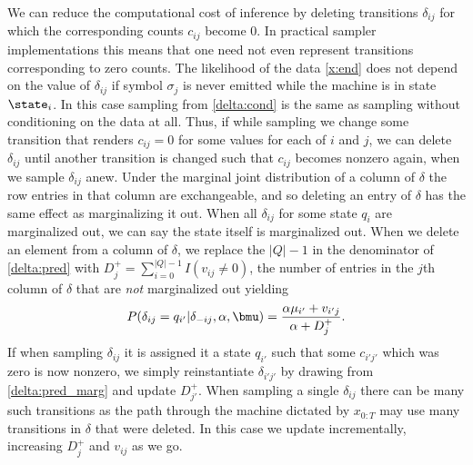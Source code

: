 We can reduce the computational cost of inference by deleting transitions $\delta_{ij}$ for which the corresponding counts $c_{ij}$ become 0.  In practical sampler implementations this means that one need not even represent transitions corresponding to zero counts.  The likelihood of the data \eqref{x:end} does not depend on the value of $\delta_{ij}$ if symbol $\sigma_j$ is never emitted while the machine is in state $\state_i$.   In this case sampling from \eqref{delta:cond} is the same as sampling without conditioning on the data at all.  Thus, if while sampling we change some transition that renders $c_{ij}=0$ for some values for each of $i$ and $j$, we can delete $\delta_{ij}$ until another transition is changed such that $c_{ij}$ becomes nonzero again, when we sample $\delta_{ij}$ anew.  Under the marginal joint distribution of a column of $\delta$ the row entries in that column are exchangeable, and so deleting an entry of $\delta$ has the same effect as marginalizing it out.  When all $\delta_{ij}$ for some state $q_i$ are marginalized out, we can say the state itself is marginalized out.
When we delete an element from a column of $\delta$, we replace the $|Q| - 1$ in the denominator of \eqref{delta:pred} with $D^+_j = \sum_{i=0}^{|Q|-1}I(v_{ij}\neq0)$, the number of entries in the $j$th column of $\delta$ that are {\em not} marginalized out yielding
\begin{equation}
P(\delta_{ij} = q_{i'}|\delta_{-ij},\alpha,\bmu) = \frac{\alpha\mu_{i'} + v_{i'j}}{\alpha + D^+_j }. \label{delta:pred_marg}
\end{equation}
If when sampling $\delta_{ij}$ it is assigned it a state $q_{i'}$ such that some $c_{i'j'}$ which was zero is now nonzero, we simply reinstantiate $\delta_{i'j'}$ by drawing from \eqref{delta:pred_marg} and update $ D^+_{j'}$.  When sampling a single $\delta_{ij}$ there can be many such transitions as the path through the machine dictated by $x_{0:T}$ may use many transitions in $\delta$ that were deleted.  In this case we update incrementally, increasing $D^+_j$ and $v_{ij}$ as we go.




